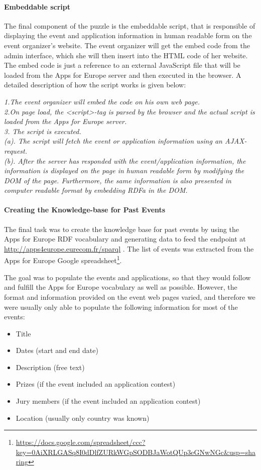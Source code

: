 \paragraph{Embeddable script}
The final component of the puzzle is the embeddable script, that is responsible of displaying the event and application information in human readable form on the event organizer's website. The event organizer will get the embed code from the admin interface, which she will then insert into the HTML code of her website. The embed code is just a reference to an external JavaScript file that will be loaded from the Apps for Europe server and then executed in the browser. A detailed description of how the script works is given below:
\begin{algorithm}
\textsl{
1.The event organizer will embed the code on his own web page.\\
2.On page load, the <script>-tag is parsed by the browser and the actual script is loaded from the Apps for Europe server.\\
3.	The script is executed.\\
(a).	The script will fetch the event or application information using an AJAX-request.\\
(b).	After the server has responded with the event/application information, the information is displayed on the page in human readable form by modifying the DOM of the page. Furthermore, the same information is  also presented in computer readable format by embedding RDFa in the DOM.
}

\end{algorithm}


\paragraph{Creating the Knowledge-base for Past Events}
The final task was to create the knowledge base for past events by using the Apps for Europe RDF vocabulary and generating data to feed the endpoint at \url{http://apps4europe.eurecom.fr/sparql} . The list of events was extracted from the Apps for Europe Google spreadsheet\footnote{\url{https://docs.google.com/spreadsheet/ccc?key=0AiXRLGASq8I0dDlfZURkWGpSODBJaWotQUp3eGNwNGc&usp=sharing}}.

The goal was to populate the events and applications, so that they would follow and fulfill the Apps for Europe vocabulary as well as possible. However, the format and information provided on the event web pages varied, and therefore we were usually only able to populate the following information for most of the events:
\begin{itemize}
\item Title
\item Dates (start and end date)
\item Description (free text)
\item Prizes (if the event included an application contest)
\item Jury members (if the event included an application contest)
\item Location (usually only country was known)
\end{itemize}

